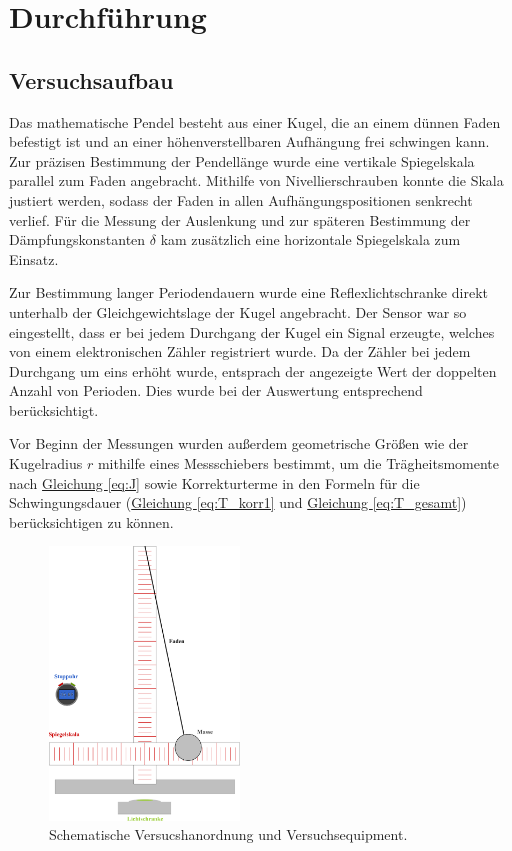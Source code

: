 \chapter{Durchführung}

\section{Versuchsaufbau}
Das mathematische Pendel besteht aus einer Kugel, die an einem dünnen Faden befestigt ist und an einer höhenverstellbaren Aufhängung frei schwingen kann. Zur präzisen Bestimmung der Pendellänge wurde eine vertikale Spiegelskala parallel zum Faden angebracht. Mithilfe von Nivellierschrauben konnte die Skala justiert werden, sodass der Faden in allen Aufhängungspositionen senkrecht verlief. Für die Messung der Auslenkung und zur späteren Bestimmung der Dämpfungskonstanten $\delta$ kam zusätzlich eine horizontale Spiegelskala zum Einsatz. 

Zur Bestimmung langer Periodendauern wurde eine Reflexlichtschranke direkt unterhalb der Gleichgewichtslage der Kugel angebracht. Der Sensor war so eingestellt, dass er bei jedem Durchgang der Kugel ein Signal erzeugte, welches von einem elektronischen Zähler registriert wurde. Da der Zähler bei jedem Durchgang um eins erhöht wurde, entsprach der angezeigte Wert der doppelten Anzahl von Perioden. Dies wurde bei der Auswertung entsprechend berücksichtigt. 

Vor Beginn der Messungen wurden außerdem geometrische Größen wie der Kugelradius $r$ mithilfe eines Messschiebers bestimmt, um die Trägheitsmomente nach \hyperref[eq:J]{Gleichung \ref*{eq:J}} sowie Korrekturterme in den Formeln für die Schwingungsdauer (\hyperref[eq:T_korr1]{Gleichung \ref*{eq:T_korr1}} und \hyperref[eq:T_gesamt]{Gleichung \ref*{eq:T_gesamt}}) berücksichtigen zu können.
\begin{figure}[!ht]
    \centering
    \includegraphics[width=0.45\textwidth]{img/14/Versuchsaubau.pdf}
    \caption{Schematische Versucshanordnung und Versuchsequipment.}
\end{figure}

